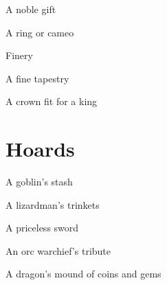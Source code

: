  

A noble gift	 

 

A ring or cameo	 

 

Finery	 

 

A fine tapestry	 

 

A crown fit for a king	 

 
\section{Hoards}   
 

A goblin's stash	 

 

A lizardman's trinkets	 

 

A priceless sword	 

 

An orc warchief's tribute	 

 

A dragon's mound of coins and gems	 

 
